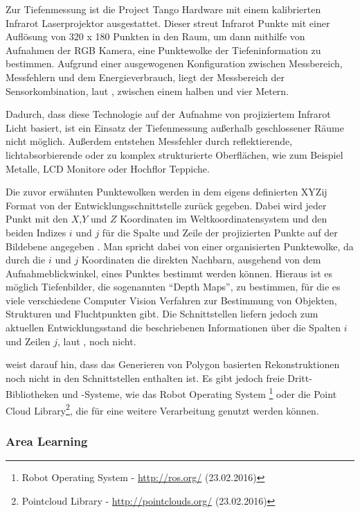 Zur Tiefenmessung ist die Project Tango Hardware mit einem kalibrierten Infrarot Laserprojektor ausgestattet. Dieser streut Infrarot Punkte mit einer Auflösung von 320 x 180 Punkten in den Raum, um dann mithilfe von Aufnahmen der RGB Kamera, eine Punktewolke der Tiefeninformation zu bestimmen. Aufgrund einer ausgewogenen Konfiguration zwischen Messbereich, Messfehlern und dem Energieverbrauch, liegt der Messbereich der Sensorkombination, laut \citet{GoogleDevelopersConcepts:online}, zwischen einem halben und vier Metern. 

Dadurch, dass diese Technologie auf der Aufnahme von projiziertem Infrarot Licht basiert, ist ein Einsatz der Tiefenmessung außerhalb geschlossener Räume nicht möglich. \citep{GoogleDevelopersConcepts:online} Außerdem entstehen Messfehler durch reflektierende,  lichtabsorbierende oder zu komplex strukturierte Oberflächen, wie zum Beispiel Metalle, LCD Monitore oder Hochflor Teppiche. 

Die zuvor erwähnten Punktewolken werden in dem eigens definierten XYZij Format von der Entwicklungsschnittstelle zurück gegeben. Dabei wird jeder Punkt mit den \(X\),\(Y\) und \(Z\) Koordinaten im Weltkoordinatensystem und den beiden Indizes \(i \) und \(j \) für die Spalte und Zeile der projizierten Punkte auf der Bildebene angegeben \citep{GoogleDevelopersConcepts:online}. Man spricht dabei von einer organisierten Punktewolke, da durch die \(i\) und \(j\) Koordinaten die direkten Nachbarn, ausgehend von dem Aufnahmeblickwinkel, eines Punktes bestimmt werden können. Hieraus ist es möglich Tiefenbilder, die sogenannten \enquote{Depth Maps}, zu bestimmen, für die es viele verschiedene Computer Vision Verfahren zur Bestimmung von Objekten, Strukturen und Fluchtpunkten gibt. Die Schnittstellen liefern jedoch zum aktuellen Entwicklungsstand die beschriebenen Informationen über die Spalten \(i\) und Zeilen \(j\), laut \citet{GoogleDevelopersKnownIssues:online}, noch nicht.

\citet{GoogleDevelopersConcepts:online} weist darauf hin, dass das Generieren von Polygon basierten Rekonstruktionen noch nicht in den Schnittstellen enthalten ist. Es gibt jedoch freie Dritt-Bibliotheken und -Systeme, wie das Robot Operating System \footnote{Robot Operating System - \url{http://ros.org/} (23.02.2016)} oder die Point Cloud Library\footnote{Pointcloud Library - \url{http://pointclouds.org/} (23.02.2016)}, die für eine weitere Verarbeitung genutzt werden können.

\subsubsection{Area Learning} \label{subsec:area-learning}

